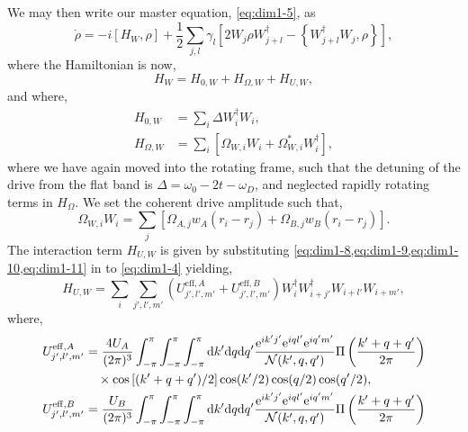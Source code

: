 We may then write our master equation, \cref{eq:dim1-5}, as 
\begin{equation}
	\dot{\rho} = -i[H_{W}, \rho] + \frac{1}{2} \sum_{j,l} \gamma_{l} \left[ 2W_{j} \rho W_{j+l}^{\dagger} - \left\{W_{j+l}^{\dagger}W_{j}, \rho\right\}\right],
	\label{eq:dim1-12}
\end{equation}
where the Hamiltonian is now,
\begin{equation}
	H_{W} = H_{0,W} + H_{\Omega,W} + H_{U,W},
	\label{eq:dim1-13}
\end{equation}
and where,
\begin{align}
	H_{0,W} &= \sum_{i} \Delta W_{i}^{\dagger}W_{i}, \label{eq:dim1-14} \\
	H_{\Omega,W} &= \sum_{i} \left[ \Omega_{W,i}W_{i} + \Omega_{W,i}^{*} W_{i}^{\dagger} \right], \label{eq:dim1-15}
\end{align}
where we have again moved into the rotating frame, such that the detuning of the drive from the flat band is \(\Delta = \omega_{0} - 2t - \omega_{D}\), and neglected rapidly rotating terms in \(H_{\Omega}\). We set the coherent drive amplitude such that,
\begin{equation}
	\Omega_{W,i}W_{i} = \sum_{j} \left[ \Omega_{A,j}w_{A}(r_{i} - r_{j}) + \Omega_{B,j}w_{B}(r_{i} - r_{j}) \right].
	\label{eq:dim1-16}
\end{equation}
The interaction term \(H_{U,W}\) is given by substituting \cref{eq:dim1-8,eq:dim1-9,eq:dim1-10,eq:dim1-11} in to \cref{eq:dim1-4} yielding,
\begin{equation}
	H_{U,W} = \sum_{i} \sum_{j',l',m'} \left( U_{j',l',m'}^{\mathrm{eff},A} + U_{j',l',m'}^{\mathrm{eff},B} \right)W_{i}^{\dagger}W_{i+j'}^{\dagger}W_{i+l'}W_{i+m'},
	\label{eq:dim1-17}
\end{equation}
where,
\begin{align}
	U_{j',l',m'}^{\mathrm{eff},A} &= \frac{4U_{A}}{(2\pi)^{3}} \int^{\pi}_{-\pi} \int^{\pi}_{-\pi} \int^{\pi}_{-\pi} \mathrm{d}k' \mathrm{d}q \mathrm{d}q' \frac{\mathrm{e}^{ik'j'}\mathrm{e}^{iql'}\mathrm{e}^{iq'm'}}{\mathcal{N}(k',q,q')} \Pi\left( \frac{k'+q+q'}{2\pi} \right) \notag \\
	&\quad \times \cos\left[(k'+q+q')/2\right]\cos(k'/2)\cos(q/2)\cos(q'/2), \label{eq:dim1-18} \\
	U_{j',l',m'}^{\mathrm{eff},B} &= \frac{U_{B}}{(2\pi)^{3}} \int^{\pi}_{-\pi} \int^{\pi}_{-\pi} \int^{\pi}_{-\pi} \mathrm{d}k' \mathrm{d}q \mathrm{d}q' \frac{\mathrm{e}^{ik'j'}\mathrm{e}^{iql'}\mathrm{e}^{iq'm'}}{\mathcal{N}(k',q,q')} \Pi\left( \frac{k'+q+q'}{2\pi} \right) \label{eq:dim1-19}
\end{align}
